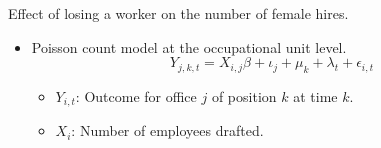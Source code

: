 \begin{frame}{Effect of losing a worker on the number of female hires.}
\begin{itemize}
    \item Poisson count model at the occupational unit level.
    \begin{equation*}
        Y_{j, k, t} = X_{i,j} \beta + \iota_j + \mu_k + \lambda_t + \epsilon_{i,t}
    \end{equation*}
    \begin{itemize}
        \item $Y_{i,t}$: Outcome for office $j$ of position $k$ at time $k$.

        \item $X_{i}$: Number of employees drafted.
    \end{itemize}

\end{itemize}
\end{frame}